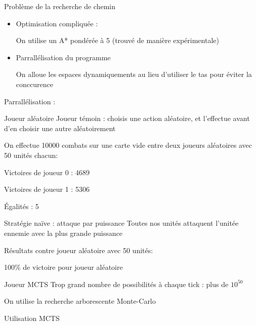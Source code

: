 \documentclass[french]{beamer}
\begin{document}
\begin{frame}{Problème de la recherche de chemin}
	\begin{itemize}
		\item Optimisation compliquée :
		
		On utilise un A* pondérée à 5 (trouvé de manière expérimentale)
		
		\item Parrallélisation du programme
		
		On alloue les espaces dynamiquements au lieu d'utiliser le tas pour éviter la conccurence
	\end{itemize}
Parrallélisation :
\end{frame}
\begin{frame}{Joueur aléatoire}
	Joueur témoin : choisis une action aléatoire, et l'effectue avant d'en choisir une autre aléatoirement
	\vspace*{1em}
	
	On effectue 10000 combats sur une carte vide entre deux joueurs aléatoires avec 50 unités chacun:
	\vspace*{1em}
	
	Victoires de joueur 0 : 4689
	
	Victoires de joueur 1 : 5306
	
	Égalités : 5
\end{frame}
\begin{frame}{Stratégie naïve : attaque par puissance}
	Toutes nos unités attaquent l'unitée ennemie avec la plus grande puissance
	
	Résultats contre joueur aléatoire avec 50 unités:
	
	100\% de victoire pour joueur aléatoire
\end{frame}
\begin{frame}{Joueur MCTS}
	Trop grand nombre de possibilités à chaque tick : plus de $10^50$
	
	On utilise la recherche arborescente Monte-Carlo
\end{frame}
\begin{frame}{Utilisation MCTS}
\begin{center}
\scriptsize
{}
\end{center}
\end{frame}
\end{document}
